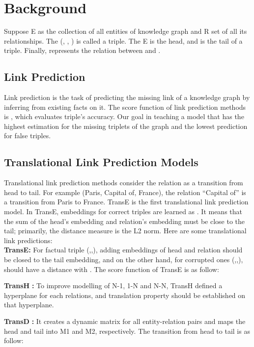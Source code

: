 \documentclass{article} \usepackage{iclr2022_conference,times}
\begin{document}
\section{Background}
\label{gen_inst}
\noindent Suppose E as the collection of all entities of knowledge graph and R set of all its relationships. The (, , ) is called a triple. The  E is the head, and  is the tail of a triple. Finally,  represents the relation between  and .
\subsection{Link Prediction}
Link prediction is the task of predicting the missing link of a knowledge graph by inferring from existing facts on it. The score function of link prediction methods is , which evaluates triple's accuracy. Our goal in teaching a model that has the highest estimation for the missing triplets of the graph and the lowest prediction for false triples.
\subsection{Translational Link Prediction Models}
Translational link prediction methods consider the relation as a transition from head to tail. For example (Paris, Capital of, France), the relation ``Capital of'' is a transition from Paris to France. TransE \citep{bordes2013translating} is the first translational link prediction model. In TransE, embeddings for correct triples are learned as . It means that the sum of the head's embedding and relation's embedding must be close to the tail; primarily, the distance measure is the L2 norm.
Here are some translational link predictions:\\

\noindent \textbf{TransE:}
For factual triple (,,), adding embeddings of head and relation should be closed to the tail embedding, and on the other hand, for corrupted ones (,,),   should have a distance with . The score function of TransE is as follow: 

\noindent \textbf{TransH} \citep{transh}\textbf{:}
To improve modelling of N-1, 1-N and N-N, TransH defined a hyperplane for each relations, and translation property should be established on that hyperplane.


\noindent \textbf{TransD} \citep{ji2015knowledge} \textbf{:}
It creates a dynamic matrix for all entity-relation pairs and maps the head and tail into M1 and M2, respectively. The transition from head to tail is as follow:
\end{document}
